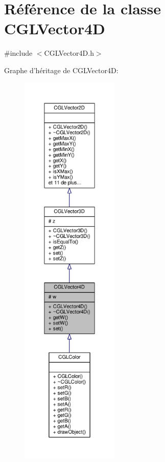 \hypertarget{class_c_g_l_vector4_d}{\section{Référence de la classe C\-G\-L\-Vector4\-D}
\label{class_c_g_l_vector4_d}
}


{\ttfamily \#include $<$C\-G\-L\-Vector4\-D.\-h$>$}



Graphe d'héritage de C\-G\-L\-Vector4\-D\-:
\nopagebreak
\begin{figure}[H]
\begin{center}
\leavevmode
\includegraphics[height=550pt]{d9/d02/class_c_g_l_vector4_d__inherit__graph}
\end{center}
\end{figure}


